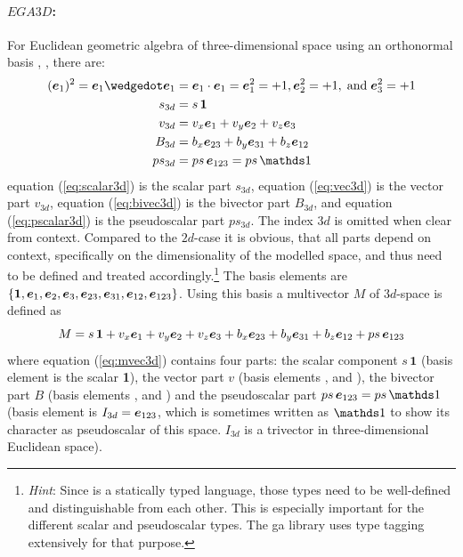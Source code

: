 \paragraph{$EGA3D$:}
For Euclidean geometric algebra of three-dimensional space using an orthonormal basis
, ,  there are:
\begin{subequations}
    \begin{align}
        (\bv{1})^2 = \bv{1} \wedgedot \bv1 & = \bv{1} \cdot \bv1 = \bv{1}^2 = +1,
        \bv{2}^2 = +1, \;\text{and}\; \bv{3}^2 = +1 \nonumber\\ 
        s_{3d} & = s \, \bm{1}
        \label{eq:scalar3d} \\
        v_{3d} & = v_x\bv{1} + v_y\bv{2} + v_z\bv{3} 
        \label{eq:vec3d} \\ 
        B_{3d} & = b_{x}\bv{23} + b_{y}\bv{31} + b_{z}\bv{12} 
        \label{eq:bivec3d} \\ 
        ps_{3d} & = ps \, \bv{123}  = ps \, \ps
        \label{eq:pscalar3d}
    \end{align}
\end{subequations}
equation (\ref{eq:scalar3d}) is the scalar part $s_{3d}$, equation (\ref{eq:vec3d}) is the
vector part $v_{3d}$, equation (\ref{eq:bivec3d}) is the bivector part $B_{3d}$, and
equation (\ref{eq:pscalar3d}) is the pseudoscalar part $ps_{3d}$. The index $3d$ is
omitted when clear from context. Compared to the $2d$-case it is obvious, that all parts
depend on context, specifically on the dimensionality of the modelled space, and thus need
to be defined and treated accordingly.\footnote{\emph{Hint}: Since \Cpp is a statically
typed language, those types need to be well-defined and distinguishable from each other.
This is especially important for the different scalar and pseudoscalar types. The ga
library uses type tagging extensively for that purpose.} The basis elements are $\{\bm{1},
\bm{e}_{1}, \bm{e}_{2}, \bm{e}_{3}, \bm{e}_{23}, \bm{e}_{31}, \bm{e}_{12}, \bm{e}_{123}\}$. Using this basis a
multivector $M$ of $3d$-space is defined as
\begin{equation}
    M = s \, \bm{1} + v_x\bm{e}_{1} + v_y\bm{e}_{2} + v_z\bm{e}_{3} 
    + b_{x}\bm{e}_{23} + b_{y}\bm{e}_{31} + b_{z}\bm{e}_{12} + ps \, \bm{e}_{123}
    \label{eq:mvec3d}  
\end{equation}
where equation (\ref{eq:mvec3d}) contains four parts: the scalar component $s \, \bm{1}$
(basis element is the scalar \textbf{1}), the vector part $v$ (basis elements ,
 and ), the bivector part $B$ (basis elements ,  and )
and the pseudoscalar part $ps \, \bv{123} = ps \, \ps$ (basis element is $I_{3d}
= \bm{e}_{123}$, which is sometimes written as $\ps$ to show its character as
pseudoscalar of this space. $I_{3d}$ is a trivector in three-dimensional Euclidean space).

